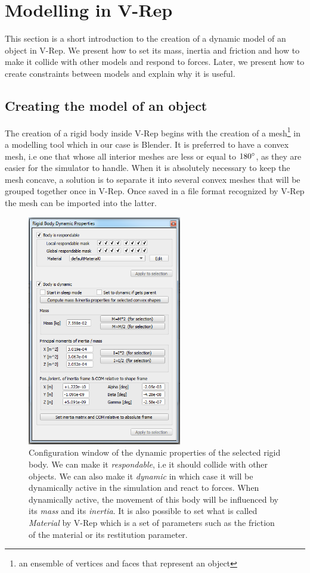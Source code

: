 \section{Modelling in V-Rep \label{sec:modelling}}
This section is a short introduction to the creation of a dynamic model of an object in V-Rep. We present how to set its mass, inertia and friction and how to make it collide with other models and respond to forces. Later, we present how to create constraints between models and explain why it is useful.

\subsection{Creating the model of an object}
The creation of a rigid body inside V-Rep begins with the creation of a mesh\footnote{an ensemble of vertices and faces that represent an object} in a modelling tool which in our case is Blender. It is preferred to have a convex mesh, i.e one that whose all interior meshes are less or equal to $180\degree$, as they are easier for the simulator to handle. When it is absolutely necessary to keep the mesh concave, a solution is to separate it into several convex meshes that will be grouped together once in V-Rep. Once saved in a file format recognized by V-Rep the mesh can be imported into the latter. 

\begin{figure}[htp]
\center
    \includegraphics[width = 0.6\textwidth]{figures/v-rep_modelling}
    \caption[Rigid body dynamic properties]{Configuration window of the dynamic properties of the selected rigid body. We can make it \emph{respondable}, i.e it should collide with other objects. We can also make it \emph{dynamic} in which case it will be dynamically active in the simulation and react to forces. When dynamically active, the movement of this body will be influenced by its \emph{mass} and its \emph{inertia}. It is also possible to set what is called \emph{Material} by V-Rep which is a set of parameters such as the friction of the material or its restitution parameter.}
    \label{fig:vrep_modelling}
\end{figure}

